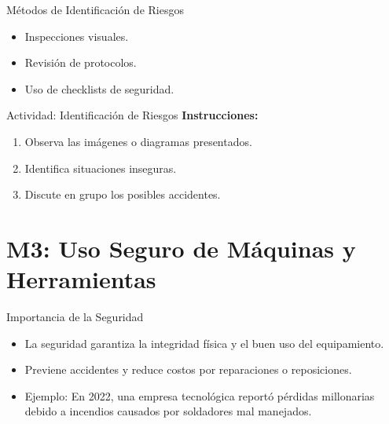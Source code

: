 \documentclass{beamer}
\begin{document}


\begin{frame}{Métodos de Identificación de Riesgos}
    \begin{itemize}
        \item Inspecciones visuales.
        \item Revisión de protocolos.
        \item Uso de checklists de seguridad.
    \end{itemize}
\end{frame}



\begin{frame}{Actividad: Identificación de Riesgos}
    \textbf{Instrucciones:}
    \begin{enumerate}
        \item Observa las imágenes o diagramas presentados.
        \item Identifica situaciones inseguras.
        \item Discute en grupo los posibles accidentes.
    \end{enumerate}
\end{frame}



\section{M3: Uso Seguro de Máquinas y Herramientas}

\begin{frame}{Importancia de la Seguridad}
    \begin{itemize}
        \item La seguridad garantiza la integridad física y el buen uso del equipamiento.
        \item Previene accidentes y reduce costos por reparaciones o reposiciones.
        \item Ejemplo: En 2022, una empresa tecnológica reportó pérdidas millonarias debido a incendios causados por soldadores mal manejados.
    \end{itemize}
\end{frame}
\end{document}

